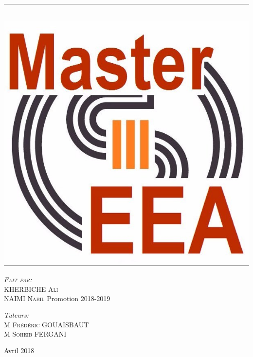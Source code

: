 \documentclass[12pt, a4paper, openany]{report}
\newcommand{\HRule}{\rule{\linewidth}{0.5mm}}
\begin{document}
\begin{titlepage}
\begin{sffamily}
\begin{center}
    \HRule \\[1cm]   %
    \includegraphics[scale=0.1]{logomaster.jpg}
    \\[1cm]
    \begin{minipage}{0.4\textwidth}
      \begin{flushleft} \large
         \textsc{\emph {Fait par:} \\KHERBICHE Ali\\ NAIMI Nabil}  
          \newline
          Promotion 2018-2019 \\
      \end{flushleft}
    \end{minipage}
    \begin{minipage}{0.4\textwidth}
      \begin{flushright} \large
        \emph{Tuteurs:\\} \textsc{M Frédéric GOUAISBAUT\\M Soheib FERGANI}
      \end{flushright}
    \end{minipage}
    \vfill
    {\large Avril 2018}
  \end{center}
  \end{sffamily}                
  \end{titlepage}  
\makeatother
   
\renewcommand{\contentsname}{Sommaire}
\tableofcontents
\listoffigures





%


  
\end{document}
